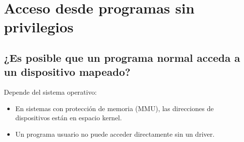 \documentclass{article}
\begin{document}
\section{ Acceso desde programas sin privilegios}
\subsection{¿Es posible que un programa normal acceda a un dispositivo mapeado?}

Depende del sistema operativo:
\begin{itemize}
    \item En sistemas con protección de memoria (MMU), las direcciones de dispositivos están en espacio kernel.
    \item Un programa usuario no puede acceder directamente sin un driver.
\end{itemize}
\end{document}
